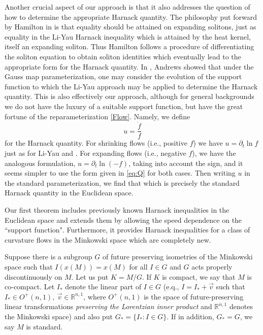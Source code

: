 Another crucial aspect of our approach is that it also addresses the question of how to determine the appropriate Harnack quantity. The philosophy put forward by Hamilton in \cite{Hamilton:/1993,Hamilton:/1995} is that equality should be attained on expanding solitons, just as equality in the Li-Yau Harnack inequality \cite{LiYau:/1986} which is attained by the heat kernel, itself an expanding soliton. Thus Hamilton follows a procedure of differentiating the soliton equation to obtain soliton identities which eventually lead to the appropriate form for the Harnack quantity. In \cite{Andrews:09/1994}, Andrews showed that under the Gauss map parameterization, one may consider the evolution of the support function to which the Li-Yau approach may be applied to determine the Harnack quantity. This is also effectively our approach, although for general backgrounds we do not have the luxury of a suitable support function, but have the great fortune of the reparameterization \eqref{Flow}. Namely, we define
\begin{equation}
\label{eq:Q}
u = \frac{\dot{f}}{f}
\end{equation}
for the Harnack quantity. For shrinking flows (i.e., positive $f$) we have $u = \partial_t \ln f$ just as for Li-Yau \cite{LiYau:/1986} and \cite{Andrews:09/1994}. For expanding flows (i.e., negative $f$), we have the analogous formulation, $u =\partial_t \ln (-f)$, taking into account the sign, and it seems simpler to use the form given in \eqref{eq:Q} for both cases. Then writing $u$ in the standard parameterization, we find that
which is precisely the standard Harnack quantity in the Euclidean space.


Our first theorem includes previously known Harnack inequalities in the Euclidean space and extends them by allowing the speed dependence on the ``support function". Furthermore, it provides Harnack inequalities for a class of curvature flows in the Minkowski space which are completely new.

Suppose there is a subgroup $G$ of future preserving isometries of the Minkowski space  such that $I(x(M))=x(M)$ for all $I\in G$ and $G$ acts properly discontinuously on $M.$ Let us put $K=M/G$. If $K$ is compact, we say that $M$ is co-compact. Let $I_{\ast}$ denote the linear part of $I\in G$ (e.q., $I=I_{\ast}+\vec{v}$ such that $I_{\ast}\in O^+(n,1),~\vec{v}\in\mathbb{R}^{n,1}$,  where $O^+(n,1)$ is the space of future-preserving linear transformations \emph{preserving the Lorentzian inner product} and $\mathbb{R}^{n,1}$ denotes the Minkowski space) and also put $G_{\ast}=\{I_{\ast}:I\in G\}.$ If in addition, $G_{\ast}=G$, we say $M$ is standard.

